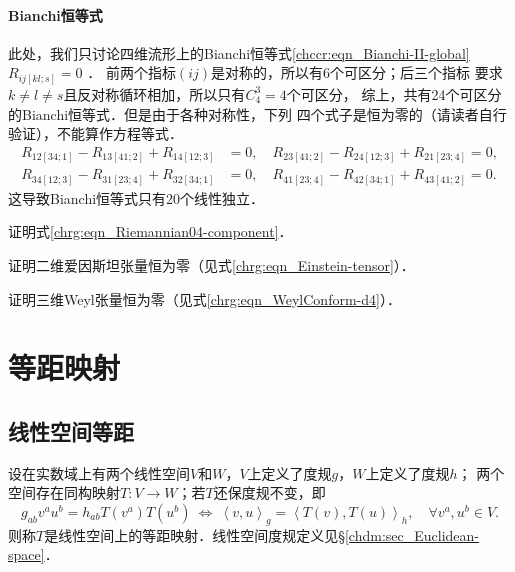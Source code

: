 \paragraph{Bianchi恒等式}\label{chrg:sec_NumOfBianchi}
此处，我们只讨论四维流形上的Bianchi恒等式\eqref{chccr:eqn_Bianchi-II-global}$R_{ij[kl;s]} = 0$ ．
前两个指标$(ij)$是对称的，所以有6个可区分；后三个指标
要求$k\neq l \neq s$且反对称循环相加，所以只有$C_4^3=4$个可区分，
综上，共有24个可区分的Bianchi恒等式．但是由于各种对称性，下列
四个式子是恒为零的（请读者自行验证），不能算作方程等式．
\begin{equation*}
    \begin{aligned}
        R_{12[34;1]} - R_{13[41;2]} + R_{14[12;3]} &=0,  \quad
        R_{23[41;2]} - R_{24[12;3]} + R_{21[23;4]} =0,  \\
        R_{34[12;3]} - R_{31[23;4]} + R_{32[34;1]} &=0,  \quad
        R_{41[23;4]} - R_{42[34;1]} + R_{43[41;2]} =0.
    \end{aligned}
\end{equation*}
这导致Bianchi恒等式只有20个线性独立．


\begin{exercise}
	证明式\eqref{chrg:eqn_Riemannian04-component}．
\end{exercise}

\begin{exercise}
	证明二维爱因斯坦张量恒为零（见式\eqref{chrg:eqn_Einstein-tensor}）．
\end{exercise}

\begin{exercise}
	证明三维Weyl张量恒为零（见式\eqref{chrg:eqn_WeylConform-d4}）．
\end{exercise}




\section{等距映射}\label{chrg:sec_isometry}


\subsection{线性空间等距}

\begin{definition}\label{chrg:def_isometry-VW}
设在实数域上有两个线性空间$V$和$W$，$V$上定义了度规$g$，$W$上定义了度规$h$；
两个空间存在同构映射$T:V\to W$；若$T$还保度规不变，即
\begin{equation}\label{chrg:eqn_isometry-VW}
    g_{ab}v^a u^b = h_{ab} T(v^a) T(u^b)    \ \Leftrightarrow \ 
    \left<v,u\right>_g = \left<T(v),T(u)\right>_h,
    \quad    \forall v^a, u^b \in V.
\end{equation}
则称$T$是线性空间上的{\heiti 等距映射}．线性空间度规定义见\S\ref{chdm:sec_Euclidean-space}．
\end{definition}

